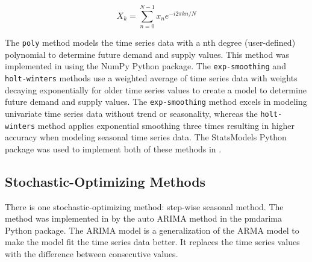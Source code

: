\begin{equation}
	\label{eq:fft}
	X_k = \sum_{n=0}^{N-1}x_n e^{-i2\pi kn/N}
\end{equation}

The \texttt{poly} method models the time series data 
with a nth degree (user-defined) polynomial to determine 
future demand and supply values. 
This method was implemented in \deploy using the 
NumPy \cite{developers_numpy_2013} Python package. 
The \texttt{exp-smoothing} and \texttt{holt-winters} 
methods use a weighted average 
of time series data with weights decaying exponentially 
for older time series values \cite{hyndman_forecasting:_2018}
to create a model to determine future demand and supply values. 
The \texttt{exp-smoothing} method excels in 
modeling univariate time series data without trend or seasonality, 
whereas the \texttt{holt-winters} method applies exponential 
smoothing three times resulting in higher accuracy when 
modeling seasonal time series data. 
The StatsModels \cite{github_community_statsmodels:_2019}
Python package was used to implement both of these methods 
in \deploy. 

\subsection{Stochastic-Optimizing Methods}
There is one stochastic-optimizing method: step-wise 
seasonal method. 
The method was implemented in \deploy by the auto \gls{ARIMA} 
method in the pmdarima \cite{noauthor_pmdarima:_2019}
Python package. 
The \gls{ARIMA} model is a generalization of the \gls{ARMA}
model to make the model fit the time series data better. 
It replaces the time series values with the difference
between consecutive values. 


